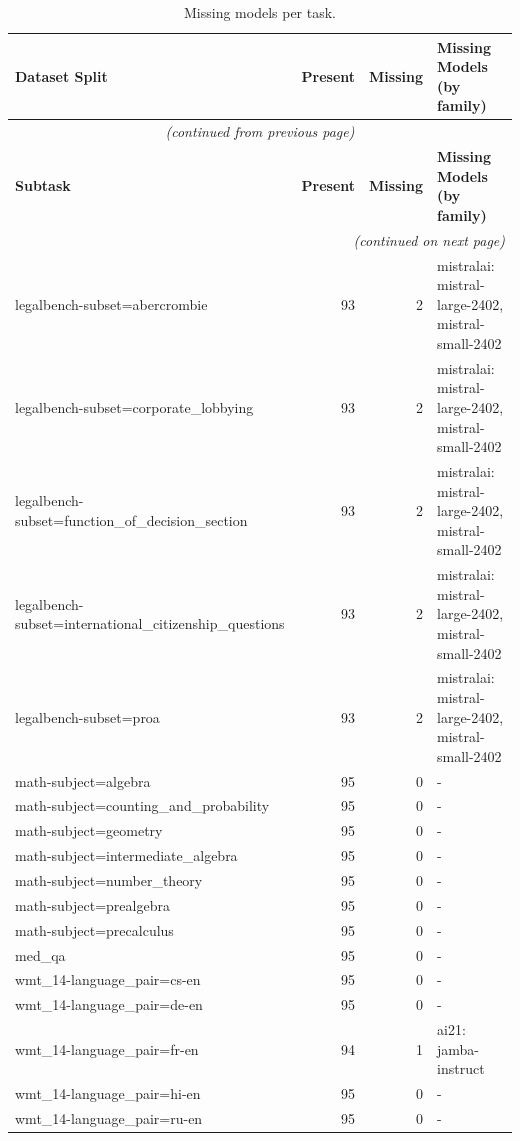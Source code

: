 \begin{longtable}{@{}p{7cm}rrp{6cm}@{}}
\caption{Missing models per task.}
\label{tab:missing-models}\\
\toprule
\textbf{Dataset Split} & \textbf{Present} & \textbf{Missing} & \textbf{Missing Models (by family)} \\
\midrule
\endfirsthead

\multicolumn{4}{c}{\textit{(continued from previous page)}} \\
\toprule
\textbf{Subtask} & \textbf{Present} & \textbf{Missing} & \textbf{Missing Models (by family)} \\
\midrule
\endhead

\midrule
\multicolumn{4}{r}{\textit{(continued on next page)}} \\
\endfoot

\bottomrule
\endlastfoot

legalbench-subset=abercrombie & 93 & 2 & mistralai: mistral-large-2402, mistral-small-2402 \\
legalbench-subset=corporate\_lobbying & 93 & 2 & mistralai: mistral-large-2402, mistral-small-2402 \\
legalbench-subset=function\_of\_decision\_section & 93 & 2 & mistralai: mistral-large-2402, mistral-small-2402 \\
legalbench-subset=international\_citizenship\_questions & 93 & 2 & mistralai: mistral-large-2402, mistral-small-2402 \\
legalbench-subset=proa & 93 & 2 & mistralai: mistral-large-2402, mistral-small-2402 \\
math-subject=algebra & 95 & 0 & - \\
math-subject=counting\_and\_probability & 95 & 0 & - \\
math-subject=geometry & 95 & 0 & - \\
math-subject=intermediate\_algebra & 95 & 0 & - \\
math-subject=number\_theory & 95 & 0 & - \\
math-subject=prealgebra & 95 & 0 & - \\
math-subject=precalculus & 95 & 0 & - \\
med\_qa & 95 & 0 & - \\
wmt\_14-language\_pair=cs-en & 95 & 0 & - \\
wmt\_14-language\_pair=de-en & 95 & 0 & - \\
wmt\_14-language\_pair=fr-en & 94 & 1 & ai21: jamba-instruct \\
wmt\_14-language\_pair=hi-en & 95 & 0 & - \\
wmt\_14-language\_pair=ru-en & 95 & 0 & - \\

\end{longtable}

